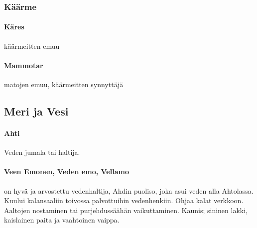  \subsubsection{Käärme}
    \paragraph{Käres} käärmeitten emuu  
    \paragraph{Mammotar} matojen emuu, käärmeitten synnyttäjä


    
\subsection{Meri ja Vesi}
  \paragraph{Ahti} Veden jumala tai haltija. 
  \paragraph{Veen Emonen, Veden emo, Vellamo} on hyvä ja arvostettu vedenhaltija, Ahdin puoliso, 
    joka asui veden alla Ahtolassa. Kuului kalansaaliin toivossa palvottuihin vedenhenkiin. Ohjaa 
    kalat verkkoon. Aaltojen nostaminen tai purjehdussäähän vaikuttaminen. Kaunis; sininen lakki, 
    kaislainen paita ja vaahtoinen vaippa.
